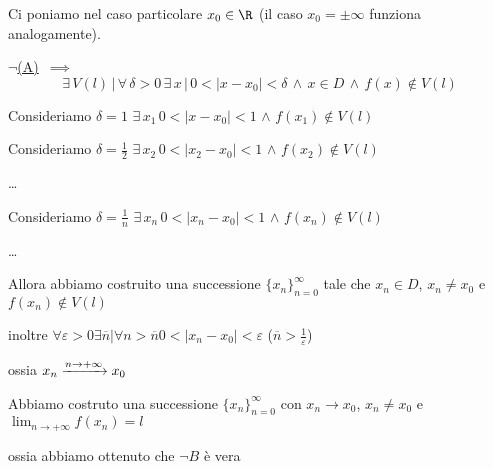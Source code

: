 {\begin{itemize}
        Ci poniamo nel caso particolare $ x_0 \in \R $ (il caso $ x_0=\pm \infty $ funziona analogamente).
        
        $\neg$\hyperref[vi:A]{(A)} $ \,\implies\,  $
        \[
            \exists\, V(l)\,|\, \forall\, \delta >0\, \exists\, x\,|\, 0<|x-x_0|<\delta \,\land\, x \in D \,\land\, f(x)\notin V(l)
        \]

        Consideriamo $\delta=1$ $ \exists\, x_{1}  \, 0<|x-x_{0} |<1 $ $\land$ $ f(x_1) \notin V(l) $
        
        Consideriamo $ \delta=\frac{1}{2} $ $ \exists\, x_{2}  \, 0<|x_{2} -x_{0} |<1 $ $\land$ $ f(x_2) \notin V(l) $

        \dots

        Consideriamo $ \delta=\frac{1}{n} $ $ \exists\, x_{n}  \, 0<|x_{n} -x_{0} |<1 $ $\land$ $ f(x_n) \notin V(l) $

        \dots

        Allora abbiamo costruito una successione $ \{x_{n} \}_{n=0}^\infty $ tale che $ x_{n} \in D $, $ x_{n}\neq x_0  $ e $ f(x_{n})\notin V(l) $ 

        inoltre $ \forall \varepsilon >0 \exists \overline{n} | \forall n>\overline{n} 0<|x_{n}-x_{0}|<\varepsilon $ ($\overline{n}>\frac{1}{\varepsilon}$)

        ossia $ x_{n} \xrightarrow{n\to + \infty} x_{0}  \displaystyle  $

        Abbiamo costruto una successione $ \{x_{n} \}_{n=0}^\infty $ con $ x_{n}\to x_0  $, $ x_{n} \neq x_0 $ e $ \lim_{n\to + \infty} f(x_{n} ) =l $ 

        ossia abbiamo ottenuto che $ \neg B $ è vera \qedhere
    \end{itemize}
}

